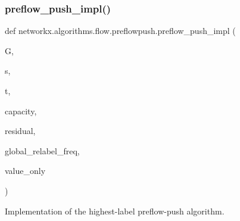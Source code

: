 \subsubsection{\texorpdfstring{preflow\+\_\+push\+\_\+impl()}{preflow\_push\_impl()}}
{\footnotesize\ttfamily def networkx.\+algorithms.\+flow.\+preflowpush.\+preflow\+\_\+push\+\_\+impl (\begin{DoxyParamCaption}\item[{}]{G,  }\item[{}]{s,  }\item[{}]{t,  }\item[{}]{capacity,  }\item[{}]{residual,  }\item[{}]{global\+\_\+relabel\+\_\+freq,  }\item[{}]{value\+\_\+only }\end{DoxyParamCaption})}

\begin{DoxyVerb}Implementation of the highest-label preflow-push algorithm.\end{DoxyVerb}
 